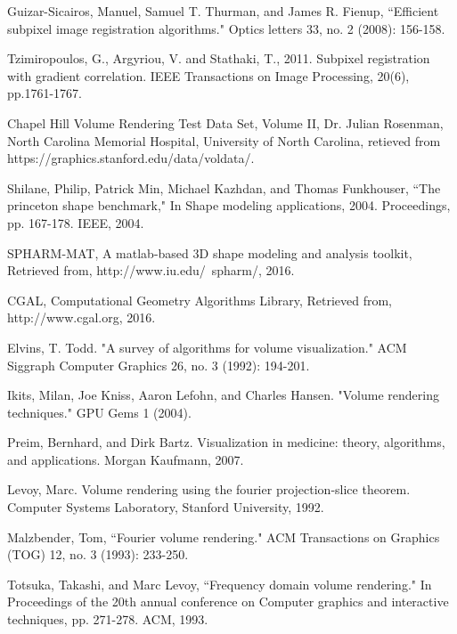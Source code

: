 \documentclass{UCF_ETD}
\begin{document}
\begin{thebibliography}{99}
Guizar-Sicairos, Manuel, Samuel T. Thurman, and James R. Fienup, ``Efficient subpixel image registration algorithms." Optics letters 33, no. 2 (2008): 156-158.

Tzimiropoulos, G., Argyriou, V. and Stathaki, T., 2011. Subpixel registration with gradient correlation. IEEE Transactions on Image Processing, 20(6), pp.1761-1767.

 Chapel Hill Volume Rendering Test Data Set, Volume II, Dr. Julian Rosenman, North Carolina Memorial Hospital, University of North Carolina, retieved from https://graphics.stanford.edu/data/voldata/. 

Shilane, Philip, Patrick Min, Michael Kazhdan, and Thomas Funkhouser, ``The princeton shape benchmark," In Shape modeling applications, 2004. Proceedings, pp. 167-178. IEEE, 2004.

SPHARM-MAT, A matlab-based 3D shape modeling and analysis toolkit, Retrieved from, http://www.iu.edu/~spharm/, 2016.

CGAL, Computational Geometry Algorithms Library, Retrieved from, http://www.cgal.org, 2016.



Elvins, T. Todd. "A survey of algorithms for volume visualization." ACM Siggraph Computer Graphics 26, no. 3 (1992): 194-201.

Ikits, Milan, Joe Kniss, Aaron Lefohn, and Charles Hansen. "Volume rendering techniques." GPU Gems 1 (2004).

Preim, Bernhard, and Dirk Bartz. Visualization in medicine: theory, algorithms, and applications. Morgan Kaufmann, 2007.

Levoy, Marc. Volume rendering using the fourier projection-slice theorem. Computer Systems Laboratory, Stanford University, 1992.

Malzbender, Tom, ``Fourier volume rendering." ACM Transactions on Graphics (TOG) 12, no. 3 (1993): 233-250.

Totsuka, Takashi, and Marc Levoy, ``Frequency domain volume rendering." In Proceedings of the 20th annual conference on Computer graphics and interactive techniques, pp. 271-278. ACM, 1993.


\end{thebibliography}
\end{document}
